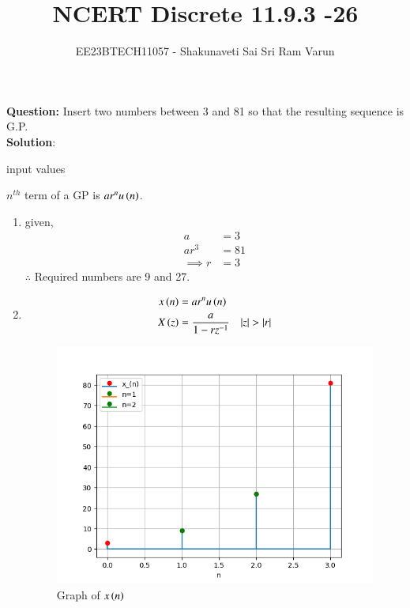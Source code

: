 \documentclass[journal,12pt,twocolumn]{IEEEtran}
\theoremstyle{remark}
\begin{document}

\vspace{3cm}

\title{NCERT Discrete 11.9.3 -26}
\author{EE23BTECH11057 - Shakunaveti Sai Sri Ram Varun$^{}$%
}
\maketitle
\newpage
\bigskip
\vspace{2cm}
\textbf{Question: }
Insert two numbers between 3 and 81 so that the resulting sequence is G.P.\\
\textbf{Solution}:\\
\begin{table}[htbp] 
\centering

\caption{input values}
\label{tab: Table 11.9.3.26.15}
\end{table}
$ n^{th}$ term of a GP is $ ar^{n}u\left(n\right)$.
\begin{enumerate}
\item 
given,
\begin{align}
a &= 3\\
ar^3 &=81\\
\implies r&=3
\end{align}
$ \therefore $ Required numbers are 9 and 27.
\item 
\begin{align}
x\brak{n} &= ar^{n}u\brak{n} \label{eq:11.9.3.26.1}\\
X\brak{z} &= \frac{a}{1-rz^{-1}} \quad |z|>|r| \label{eq:11.9.3.26.2}
\end{align}
\begin{figure}[h!]
    \includegraphics[width = \columnwidth]{figs/Figure_1.png}
    \caption{Graph of $ x\left(n\right)$ }
    \label{fig: 11.9.3.26.17}
\end{figure}
\end{enumerate}
\end{document}

